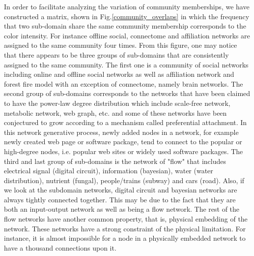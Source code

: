 \documentclass[..]{revtex4}
\begin{document}
In order to facilitate analyzing the variation of community memberships, we have constructed a matrix, shown in Fig.\ref{community_overlaps} in which the frequency that two sub-domain share the same community membership corresponds to the color intensity. For instance offline social, connectome and affiliation networks are assigned to the same community four times. From this figure, one may notice that there appears to be three groups of sub-domains that are consistently assigned to the same community. The first one is a community of social networks including online and offline social networks as well as affiliation network and forest fire model with an exception of connectome, namely brain networks. The second group of sub-domains corresponds to the networks that have been claimed to have the power-law degree distribution which include scale-free network, metabolic network, web graph, etc. and some of these networks have been conjectured to grow according to a mechanism called preferential attachment. In this network generative process, newly added nodes in a network, for example newly created web page or software package, tend to connect to the popular or high-degree nodes, i.e. popular web sites or widely used software packages. The third and last group of sub-domains is the network of "flow" that includes electrical signal (digital circuit), information (bayesian), water (water distribution), nutrient (fungal), people/trains (subway) and cars (road).  Also, if we look at the subdomain networks, digital circuit and bayesian networks are always tightly connected together. This may be due to the fact that they are both an input-output network as well as being a flow network. The rest of the flow networks have another common property, that is, physical embedding of the network. These networks have a strong constraint of the physical limitation. For instance, it is almost impossible for a node in a physically embedded network to have a thousand connections upon it.
\end{document}
